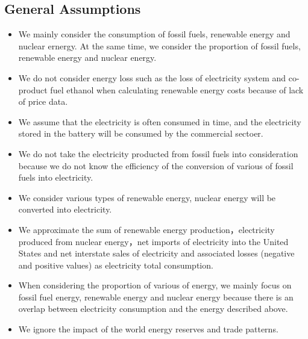 \documentclass{mcmthesis}
\begin{document}
\subsection{General Assumptions}
\begin{itemize}
	\item We mainly consider the consumption of fossil fuels, renewable energy and nuclear ernergy. At the same time, we consider the proportion of fossil fuels, renewable energy and nuclear energy.
	\item We do not consider energy loss such as the loss of  electricity system and co-product fuel ethanol when calculating renewable energy costs because of lack of price data.
	\item We assume that the electricity is often consumed in time, and the electricity stored in the battery will be consumed by the commercial sectoer.
	\item We do not take the electricity producted from fossil fuels into consideration because we do not know the efficiency of the conversion of various of fossil fuels into electricity.
	\item We consider various types of renewable energy,  nuclear energy will be converted into electricity.
	\item We approximate the sum of renewable energy production，electricity produced from nuclear energy，net imports of electricity into the United States and net interstate sales of electricity and associated losses (negative and positive values) as electricity total consumption.
	\item When considering the proportion of various of energy, we mainly focus on fossil fuel energy, renewable energy and nuclear energy because there is an overlap between electricity consumption and the energy described above.
	\item We ignore the impact of the world energy reserves and trade patterns.
\end{itemize}
\end{document}

